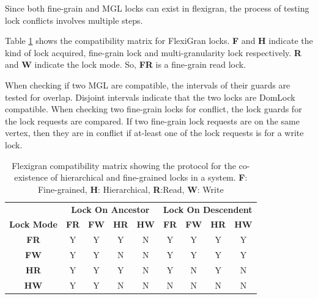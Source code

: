 Since both fine-grain and MGL locks can exist in flexigran, the process of testing lock conflicts involves multiple steps. 

Table \ref{tab:flexigran_locks} shows the compatibility matrix for FlexiGran locks. \textbf{F} and \textbf{H} indicate the kind of lock acquired, fine-grain lock and multi-granularity lock respectively. \textbf{R} and \textbf{W} indicate the lock mode. So, \textbf{FR} is a fine-grain read lock.

When checking if two MGL are compatible, the intervals of their guards are tested for overlap. Disjoint intervals indicate that the two locks are DomLock compatible. When checking two fine-grain locks for conflict, the lock guards for the lock requests are compared. If two fine-grain lock requests are on the same vertex, then they are in conflict if at-least one of the lock requests is for a write lock.


\begin{table}[h]
    \centering
    \captionsetup{justification=centering}
    \begin{tabular}{c|cccc|cccc|}
        \multicolumn{1}{c}{} & \multicolumn{4}{c|}{\textbf{Lock On Ancestor}} & \multicolumn{4}{c}{\textbf{Lock On Descendent}} \\
        \cline{2-9}
        \textbf{Lock Mode} & \textbf{FR} & \textbf{FW} & \textbf{HR} & \textbf{HW} & \textbf{FR} & \textbf{FW} & \textbf{HR} & \textbf{HW} \\
        \hline
        \textbf{FR} & \cellcolor{green!25} Y & \cellcolor{green!25} Y & \cellcolor{green!25} Y & \cellcolor{red!25} N & \cellcolor{green!25} Y & \cellcolor{green!25} Y & \cellcolor{green!25} Y & \cellcolor{green!25} Y \\
        \textbf{FW} & \cellcolor{green!25} Y & \cellcolor{green!25} Y & \cellcolor{red!25} N & \cellcolor{red!25} N & \cellcolor{green!25} Y & \cellcolor{green!25} Y & \cellcolor{green!25} Y & \cellcolor{green!25} Y \\
        \textbf{HR} & \cellcolor{green!25} Y & \cellcolor{green!25} Y & \cellcolor{green!25} Y & \cellcolor{red!25} N & \cellcolor{green!25} Y & \cellcolor{red!25} N & \cellcolor{green!25} Y & \cellcolor{red!25} N \\
        \textbf{HW} & \cellcolor{green!25} Y & \cellcolor{green!25} Y & \cellcolor{red!25} N & \cellcolor{red!25} N & \cellcolor{red!25} N & \cellcolor{red!25} N & \cellcolor{red!25} N & \cellcolor{red!25} N \\
    \end{tabular}
    \caption{Flexigran compatibility matrix showing the protocol for the co-existence of hierarchical and fine-grained locks in a system. \textbf{F}: Fine-grained, \textbf{H}: Hierarchical, \textbf{R}:Read, \textbf{W}: Write}
    \label{tab:flexigran_locks}
\end{table}

